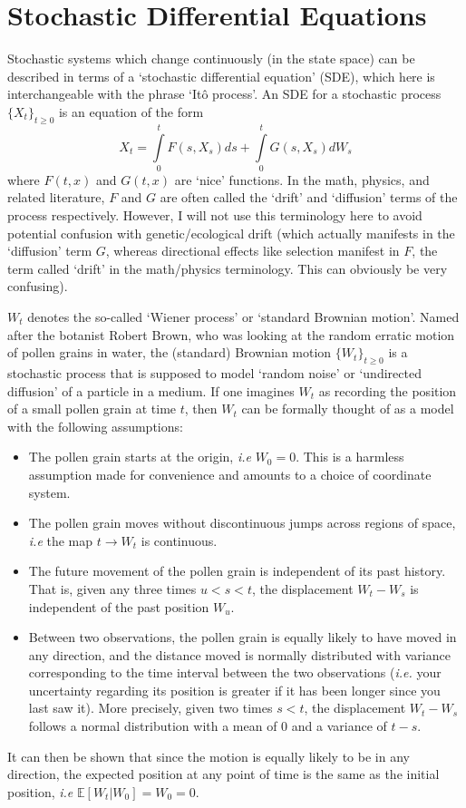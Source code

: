 \section{Stochastic Differential Equations}\label{intro_SDE}
Stochastic systems which change continuously (in the state space) can be described in terms of a `stochastic differential equation' (SDE), which here is interchangeable with the phrase `It\^o process'. An SDE for a stochastic process $\{X_t\}_{t \geq 0}$ is an equation of the form
\begin{equation}
	\label{ito_SDE_integral}
	X_t = \int\limits_{0}^{t} F(s,X_s)ds + \int\limits_{0}^{t} G(s,X_s)dW_s
\end{equation}
where $F(t,x)$ and $G(t,x)$ are `nice' functions. In the math, physics, and related literature, $F$ and $G$ are often called the `drift' and `diffusion' terms of the process respectively. However, I will not use this terminology here to avoid potential confusion with genetic/ecological drift (which actually manifests in the `diffusion' term $G$, whereas directional effects like selection manifest in $F$, the term called `drift' in the math/physics terminology. This can obviously be very confusing).

$W_t$ denotes the so-called `Wiener process' or `standard Brownian motion'. Named after the botanist Robert Brown, who was looking at the random erratic motion of pollen grains in water, the (standard) Brownian motion $\{W_t\}_{t \geq 0}$ is a stochastic process that is supposed to model `random noise' or `undirected diffusion' of a particle in a medium. If one imagines $W_t$ as recording the position of a small pollen grain at time $t$, then $W_t$ can be formally thought of as a model with the following assumptions:
\begin{itemize}
	\item The pollen grain starts at the origin, \emph{i.e} $W_0 = 0$. This is a harmless assumption made for convenience and amounts to a choice of coordinate system.
	\item The pollen grain moves without discontinuous jumps across regions of space, \emph{i.e} the map $t \to W_t$ is continuous.
	\item The future movement of the pollen grain is independent of its past history. That is, given any three times $u < s < t$, the displacement $W_t - W_s$ is independent of the past position $W_u$.
	\item Between two observations, the pollen grain is equally likely to have moved in any direction, and the distance moved is normally distributed with variance corresponding to the time interval between the two observations (\emph{i.e.} your uncertainty regarding its position is greater if it has been longer since you last saw it). More precisely, given two times $s < t$, the displacement $W_t - W_s$ follows a normal distribution with a mean of $0$  and a variance of $t-s$.
\end{itemize}
It can then be shown that since the motion is equally likely to be in any direction, the expected position at any point of time is the same as the initial position, \emph{i.e} $\mathbb{E}[W_t | W_0] = W_0 = 0$.

